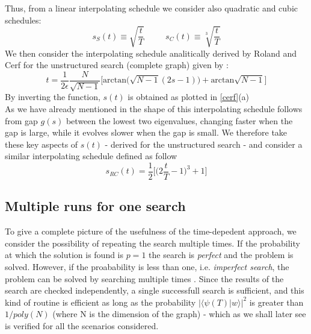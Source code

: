         Thus, from a linear interpolating schedule we consider also quadratic and cubic schedules:
        \begin{equation}
          s_S(t) \equiv \sqrt{\frac{t}{T}} \hspace{30pt} s_C(t) \equiv \sqrt[3]{\frac{t}{T}}
        \end{equation}
        We then consider the interpolating schedule analitically derived by Roland and Cerf for the unstructured search (complete graph) given by :
        \begin{equation}
            t = \frac{1}{2\epsilon}\frac{N}{\sqrt{N-1}}\Big[\mbox{arctan}\big(\sqrt{N-1}(2s-1)\big) + \mbox{arctan}\sqrt{N-1}\Big]
        \end{equation}
        By inverting the function, $s(t)$ is obtained as plotted in \cref{cerf}(a) \\
        As we have already mentioned in  the shape of this interpolating schedule follows from gap $g(s)$ between the lowest two eigenvalues, changing faster when the gap is large, while it evolves slower when the gap is small. We therefore take these key aspects of $s(t)$ - derived for the unstructured search - and consider a similar interpolating schedule defined as follow
        \begin{equation}
            s_{RC}(t) = \frac{1}{2}\Big[\Big(2\frac{t}{T}-1\Big)^{3}+1\Big]
        \end{equation}

        


        \subsection{Multiple runs for one search}\label{subsec:multiple_runs}
        To give a complete picture of the usefulness of the time-depedent approach, we consider the possibility of repeating the search multiple times. If the probability at which the solution is found is $p=1$ the search is \textit{perfect} and the problem is solved. However, if the proabability is less than one, i.e. \textit{imperfect search}, the problem can be solved by searching multiple times . Since the results of the search are checked independently, a single successfull search is sufficient, and this kind of routine is efficient as long as the probability $\big|\langle\psi(T)| w\rangle\big|^2$ is greater than $1/poly(N)$ (where N is the dimension of the graph) \cite{Morley2018} - which as we shall later see is verified for all the scenarios considered.

